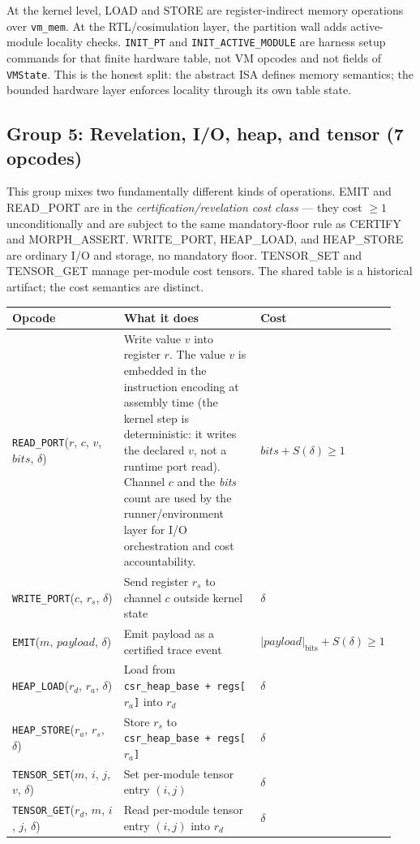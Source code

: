 \documentclass[11pt,a4paper]{article}
\theoremstyle{plain}
\theoremstyle{definition}
\theoremstyle{remark}
\begin{document}
At the kernel level, LOAD and STORE are register-indirect memory operations over \texttt{vm\_mem}. At the RTL/cosimulation layer, the partition wall adds active-module locality checks. \texttt{INIT\_PT} and \texttt{INIT\_ACTIVE\_MODULE} are harness setup commands for that finite hardware table, not VM opcodes and not fields of \texttt{VMState}. This is the honest split: the abstract ISA defines memory semantics; the bounded hardware layer enforces locality through its own table state.

\subsection{Group 5: Revelation, I/O, heap, and tensor (7 opcodes)}

This group mixes two fundamentally different kinds of operations. EMIT and READ\_PORT are in the \emph{certification/revelation cost class} --- they cost $\geq 1$ unconditionally and are subject to the same mandatory-floor rule as CERTIFY and MORPH\_ASSERT. WRITE\_PORT, HEAP\_LOAD, and HEAP\_STORE are ordinary I/O and storage, no mandatory floor. TENSOR\_SET and TENSOR\_GET manage per-module cost tensors. The shared table is a historical artifact; the cost semantics are distinct.

\begin{center}
\small
\begin{tabular}{@{}p{0.35\linewidth}p{0.41\linewidth}p{0.18\linewidth}@{}}
\toprule
Opcode & What it does & Cost \\
\midrule
\texttt{READ\_PORT}($r$, $c$, $v$, $\mathit{bits}$, $\delta$) & Write value $v$ into register $r$. The value $v$ is embedded in the instruction encoding at assembly time (the kernel step is deterministic: it writes the declared $v$, not a runtime port read). Channel $c$ and the \textit{bits} count are used by the runner/environment layer for I/O orchestration and cost accountability. & $\mathit{bits} + S(\delta) \geq 1$ \\
\texttt{WRITE\_PORT}($c$, $r_s$, $\delta$) & Send register $r_s$ to channel $c$ outside kernel state & $\delta$ \\
\texttt{EMIT}($m$, $\mathit{payload}$, $\delta$) & Emit payload as a certified trace event & $|\mathit{payload}|_{\mathrm{bits}} + S(\delta) \geq 1$ \\
\texttt{HEAP\_LOAD}($r_d$, $r_a$, $\delta$) & Load from \texttt{csr\_heap\_base + regs[$r_a$]} into $r_d$ & $\delta$ \\
\texttt{HEAP\_STORE}($r_a$, $r_s$, $\delta$) & Store $r_s$ to \texttt{csr\_heap\_base + regs[$r_a$]} & $\delta$ \\
\texttt{TENSOR\_SET}($m$, $i$, $j$, $v$, $\delta$) & Set per-module tensor entry $(i,j)$ & $\delta$ \\
\texttt{TENSOR\_GET}($r_d$, $m$, $i$, $j$, $\delta$) & Read per-module tensor entry $(i,j)$ into $r_d$ & $\delta$ \\
\bottomrule
\end{tabular}
\normalsize
\end{center}
\end{document}
